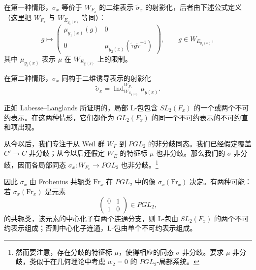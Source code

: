 \documentclass[11pt,a4paper]{article}
\begin{document}
在第一种情形，$\sigma_x$ 等价于 $W_{F_x}$ 的二维表示 $\tilde\sigma_x$ 的射影化，后者由下述公式定义（这里把 $W_{F_x}$ 与 $W_{E_{y_1(x)}}$ 等同）：
\begin{equation}\tag{7.3}
g\mapsto\begin{pmatrix}\mu_{y_1(x)}(g)&0\\ 0&\mu_{y_2(x)}(\tilde\tau g\tilde\tau^{-1})\end{pmatrix},
\qquad g\in W_{E_{y_1(x)}},
\end{equation}
其中 $\mu_{y_i(x)}$ 表示 $\mu$ 在 $W_{E_{y_i(x)}}$ 上的限制。

在第二种情形，$\sigma_x$ 同构于二维诱导表示的射影化
\begin{equation}\tag{7.4}
\tilde\sigma_x = \operatorname{Ind}_{W_{E_{y(x)}}}^{W_{F_x}}\mu_{y(x)}.
\end{equation}

正如 Labesse--Langlands 所证明的，局部 L-包包含 $SL_2(F_x)$ 的一个或两个不可约表示。在这两种情形，它们都作为 $GL_2(F_x)$ 的同一个不可约表示的不可约直和项出现。

从今以后，我们专注于从 Weil 群 $W_F$ 到 $PGL_2$ 的非分歧同态。我们已经假定覆盖 $C'\to C$ 非分歧；从今以后还假定 $W_E$ 的特征标 $\mu$ 也非分歧。那么我们的 $\sigma$ 非分歧，因而各局部同态 $\sigma_x: W_{F_x}\to PGL_2$ 也非分歧。\footnote{然而要注意，存在分歧的特征标 $\mu$，使得相应的同态 $\sigma$ 非分歧。要求 $\mu$ 非分歧，类似于在几何理论中考虑 $w_2=0$ 的 $PGL_2$-局部系统。}


因此 $\sigma_x$ 由 Frobenius 共轭类 $\mathrm{Fr}_x$ 在 $PGL_2$ 中的像 $\sigma_x(\mathrm{Fr}_x)$ 决定。有两种可能：若 $\sigma_x(\mathrm{Fr}_x)$ 是元素
\begin{equation}\tag{7.5}
\begin{pmatrix}0&1\\ 1&0\end{pmatrix}\in PGL_2,
\end{equation}
的共轭类，该元素的中心化子有两个连通分支，则 L-包由 $SL_2(F_x)$ 的两个不可约表示组成；否则中心化子连通，L-包由单个不可约表示组成。
\end{document}
